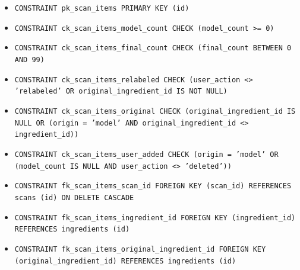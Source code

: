 \begin{itemize}
\item \raggedright {\small\texttt{CONSTRAINT pk\_\allowbreak{}\allowbreak{}scan\_\allowbreak{}\allowbreak{}items PRIMARY KEY (id)}}
\item \raggedright {\small\texttt{CONSTRAINT ck\_\allowbreak{}\allowbreak{}scan\_\allowbreak{}\allowbreak{}items\_\allowbreak{}\allowbreak{}model\_\allowbreak{}\allowbreak{}count CHECK (model\_\allowbreak{}\allowbreak{}count >= 0)}}
\item \raggedright {\small\texttt{CONSTRAINT ck\_\allowbreak{}\allowbreak{}scan\_\allowbreak{}\allowbreak{}items\_\allowbreak{}\allowbreak{}final\_\allowbreak{}\allowbreak{}count CHECK (final\_\allowbreak{}\allowbreak{}count BETWEEN 0 AND 99)}}
\item \raggedright {\small\texttt{CONSTRAINT ck\_\allowbreak{}\allowbreak{}scan\_\allowbreak{}\allowbreak{}items\_\allowbreak{}\allowbreak{}relabeled CHECK (user\_\allowbreak{}\allowbreak{}action <> 'relabeled' OR original\_\allowbreak{}\allowbreak{}ingredient\_\allowbreak{}\allowbreak{}id IS NOT NULL)}}
\item \raggedright {\small\texttt{CONSTRAINT ck\_\allowbreak{}\allowbreak{}scan\_\allowbreak{}\allowbreak{}items\_\allowbreak{}\allowbreak{}original CHECK (original\_\allowbreak{}\allowbreak{}ingredient\_\allowbreak{}\allowbreak{}id IS NULL OR (origin = 'model' AND original\_\allowbreak{}\allowbreak{}ingredient\_\allowbreak{}\allowbreak{}id <> ingredient\_\allowbreak{}\allowbreak{}id))}}
\item \raggedright {\small\texttt{CONSTRAINT ck\_\allowbreak{}\allowbreak{}scan\_\allowbreak{}\allowbreak{}items\_\allowbreak{}\allowbreak{}user\_\allowbreak{}\allowbreak{}added CHECK (origin = 'model' OR (model\_\allowbreak{}\allowbreak{}count IS NULL AND user\_\allowbreak{}\allowbreak{}action <> 'deleted'))}}
\item \raggedright {\small\texttt{CONSTRAINT fk\_\allowbreak{}\allowbreak{}scan\_\allowbreak{}\allowbreak{}items\_\allowbreak{}\allowbreak{}scan\_\allowbreak{}\allowbreak{}id FOREIGN KEY (scan\_\allowbreak{}\allowbreak{}id) REFERENCES scans (id) ON DELETE CASCADE}}
\item \raggedright {\small\texttt{CONSTRAINT fk\_\allowbreak{}\allowbreak{}scan\_\allowbreak{}\allowbreak{}items\_\allowbreak{}\allowbreak{}ingredient\_\allowbreak{}\allowbreak{}id FOREIGN KEY (ingredient\_\allowbreak{}\allowbreak{}id) REFERENCES ingredients (id)}}
\item \raggedright {\small\texttt{CONSTRAINT fk\_\allowbreak{}\allowbreak{}scan\_\allowbreak{}\allowbreak{}items\_\allowbreak{}\allowbreak{}original\_\allowbreak{}\allowbreak{}ingredient\_\allowbreak{}\allowbreak{}id FOREIGN KEY (original\_\allowbreak{}\allowbreak{}ingredient\_\allowbreak{}\allowbreak{}id) REFERENCES ingredients (id)}}
\end{itemize}
